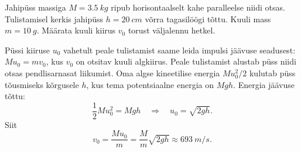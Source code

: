 
Jahipüss massiga $M = \SI{3,5}{kg}$ ripub horisontaalselt kahe paralleelse niidi otsas. Tulistamisel kerkis jahipüss $h = \SI{20}{cm}$ võrra tagasilöögi tõttu. Kuuli mass $m = \SI{10}{g}$. Määrata kuuli kiirus $v_0$ torust väljalennu hetkel.

\hint

\solu
Püssi kiiruse $u_{0}$ vahetult peale tulistamist saame leida impulsi jäävuse seadusest:
$M u_{0}=m v_{0}$, kus $v_{0}$ on otsitav kuuli algkiirus. Peale tulistamist alustab püss niidi otsas pendlisarnasat liikumist. Oma algse kineetilise energia $M u_{0}^{2} / 2$ kulutab püss tõusmiseks kõrgusele $h$, kus tema potentsiaalne energia on $M g h$. Energia jäävuse tõttu:
$$
\frac{1}{2} M u_{0}^{2}=M g h \quad \Rightarrow \quad u_{0}=\sqrt{2 g h}.
$$
Siit
$$
v_{0}=\frac{M u_{0}}{m}=\frac{M}{m} \sqrt{2 g h} \approx \SI{693}{m/s}.
$$

\probend